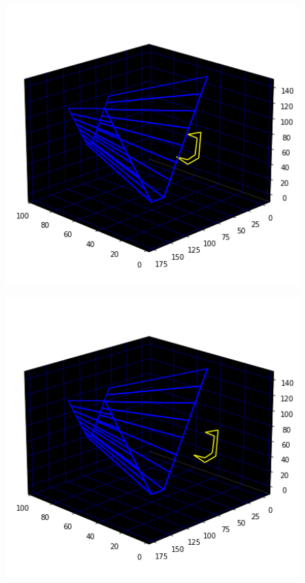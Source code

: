 \begin{minipage}[c]{0.31\linewidth}
\begin{figure}[H]
    \centering
    \begin{adjustbox}{width=5.5cm,center}
      \includegraphics[width=12cm]{src/jump/web_29.png}%
    \end{adjustbox}
\end{figure}
\end{minipage}
\begin{minipage}[c]{0.31\linewidth}
\begin{figure}[H]
    \centering
    \begin{adjustbox}{width=5.5cm,center}
      \includegraphics[width=12cm]{src/jump/web_15.png}%
    \end{adjustbox}
\end{figure}
\end{minipage}
